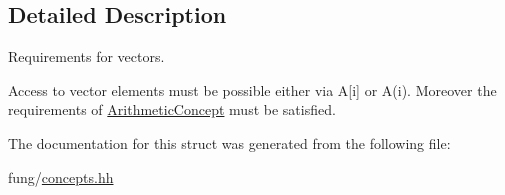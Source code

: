 \subsection{Detailed Description}
Requirements for vectors. 

Access to vector elements must be possible either via A\mbox{[}i\mbox{]} or A(i). Moreover the requirements of \hyperlink{structFunG_1_1Concepts_1_1ArithmeticConcept}{Arithmetic\-Concept} must be satisfied. 

The documentation for this struct was generated from the following file\-:\begin{DoxyCompactItemize}
\item 
fung/\hyperlink{concepts_8hh}{concepts.\-hh}\end{DoxyCompactItemize}
